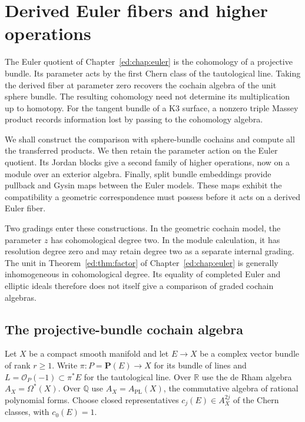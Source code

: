 \chapter{Derived Euler fibers and higher operations}
\label{df:chap:fibers}

The Euler quotient of Chapter~\ref{ed:chap:euler} is the cohomology
of a projective bundle. Its parameter acts by the first Chern class of
the tautological line. Taking the derived fiber at parameter zero
recovers the cochain algebra of the unit sphere bundle.
The resulting cohomology need not determine its
multiplication up to homotopy. For the tangent bundle of a K3 surface,
a nonzero triple Massey product records information lost by passing
to the cohomology algebra.

We shall construct the comparison with sphere-bundle cochains and compute
all the transferred products. We then retain the parameter action on
the Euler quotient. Its Jordan blocks give a second family of higher
operations, now on a module over an exterior algebra. Finally, split
bundle embeddings provide pullback and Gysin maps between the Euler
models. These maps exhibit the compatibility a geometric correspondence
must possess before it acts on a derived Euler fiber.

Two gradings enter these constructions. In the geometric cochain model,
the parameter $z$ has cohomological degree two. In the module calculation,
it has resolution degree zero and may retain degree two as a separate
internal grading. The unit in Theorem~\ref{ed:thm:factor} of
Chapter~\ref{ed:chap:euler} is generally
inhomogeneous in cohomological degree. Its equality of completed Euler
and elliptic ideals therefore does not itself give a comparison of
graded cochain algebras.

\section{The projective-bundle cochain algebra}
\label{df:sec:projective}

Let $X$ be a compact smooth manifold and let $E\to X$ be a complex
vector bundle of rank $r\geq1$. Write
$\pi:P=\mathbf P(E)\to X$ for its bundle of lines and
$L=\mathcal O_P(-1)\subset\pi^*E$ for the tautological line.
Over $\mathbb R$ use the de Rham algebra $A_X=\Omega^*(X)$.
Over $\mathbb Q$ use $A_X=A_{\mathrm{PL}}(X)$, the commutative
algebra of rational polynomial forms. Choose closed representatives
$c_j(E)\in A_X^{2j}$ of the Chern classes, with $c_0(E)=1$.

